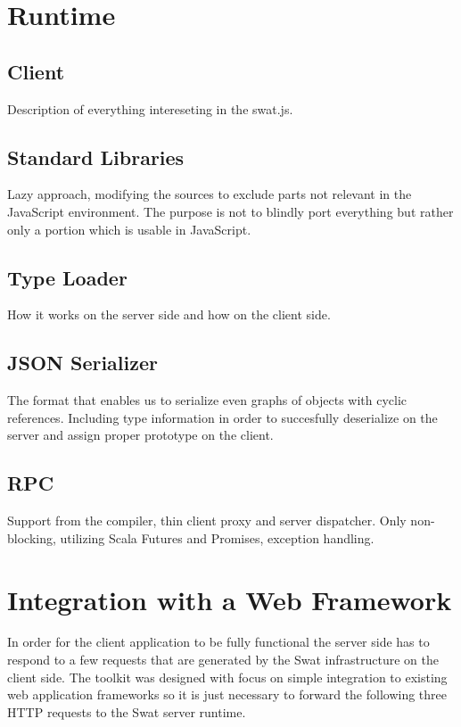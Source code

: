 \documentclass[12pt,a4paper]{report}
\begin{document}
\section{Runtime}

\subsection{Client}

Description of everything intereseting in the swat.js.

\subsection{Standard Libraries}

Lazy approach, modifying the sources to exclude parts not relevant in the JavaScript environment. The purpose is not to blindly port everything but rather only a portion which is usable in JavaScript.

\subsection{Type Loader}

How it works on the server side and how on the client side.

\subsection{JSON Serializer}

The format that enables us to serialize even graphs of objects with cyclic references. Including type information in order to succesfully deserialize on the server and assign proper prototype on the client.

\subsection{RPC}

Support from the compiler, thin client proxy and server dispatcher. Only non-blocking, utilizing Scala Futures and Promises, exception handling.

\section{Integration with a Web Framework}

In order for the client application to be fully functional the server side has to respond to a few requests that are generated by the Swat infrastructure on the client side. The toolkit was designed with focus on simple integration to existing web application frameworks so it is just necessary to forward the following three HTTP requests to the Swat server runtime.
\end{document}

